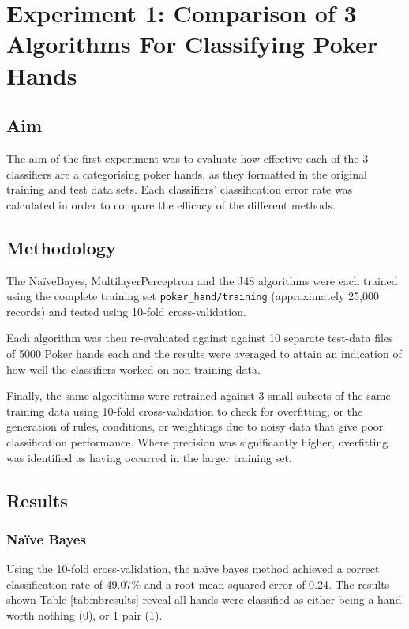 \documentclass[10pt, a4paper]{article}
\begin{document}
\section*{Experiment 1: Comparison of 3 Algorithms For Classifying Poker Hands}

\subsection*{Aim}

The aim of the first experiment was to evaluate how effective each of the 3 classifiers are a categorising poker hands, as they formatted in the original training and test data sets. Each classifiers' classification error rate was calculated in order to compare the efficacy of the different methods.

\subsection*{Methodology}

The Na\"iveBayes, MultilayerPerceptron and the J48 algorithms were each trained using the complete training set \texttt{poker\_hand/training} (approximately 25,000 records) and tested using 10-fold cross-validation.

Each algorithm was then re-evaluated against against 10 separate test-data files of 5000 Poker hands each and the results were averaged to attain an indication of how well the classifiers worked on non-training data.

Finally, the same algorithms were retrained against 3 small subsets of the same training data using 10-fold cross-validation to check for overfitting, or the generation of rules, conditions, or weightings due to noisy data that give poor classification performance. Where precision was significantly higher, overfitting was identified as having occurred in the larger training set.

\subsection*{Results}

\subsubsection*{Na\"ive Bayes}

Using the 10-fold cross-validation, the na\"ive bayes method achieved a correct classification rate of 49.07\% and a root mean squared error of 0.24. The results shown Table \ref{tab:nbresults} reveal all hands were classified as either being a hand worth nothing (0), or 1 pair (1). 
\end{document}
